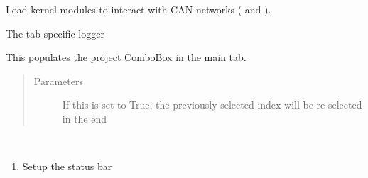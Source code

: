 \documentclass[letterpaper,10pt,english]{sphinxmanual}
\begin{document}
\begin{fulllineitems}
\begin{fulllineitems}
\end{fulllineitems}


\begin{fulllineitems}
\label{\detokenize{src:src.MainTab.MainTab.loadKernelModules}}
Load kernel modules to interact with CAN networks ( and ).

\end{fulllineitems}


\begin{fulllineitems}
\label{\detokenize{src:src.MainTab.MainTab.logger}}
The tab specific logger

\end{fulllineitems}


\begin{fulllineitems}
\label{\detokenize{src:src.MainTab.MainTab.populateProjects}}
This populates the project ComboBox in the main tab.
\begin{quote}\begin{description}
\item[{Parameters}] \leavevmode
{} \textendash{} If this is set to True, the previously selected index will be re-selected in the end

\end{description}\end{quote}

\end{fulllineitems}


\begin{fulllineitems}
\label{\detokenize{src:src.MainTab.MainTab.prepareUI}}~\begin{enumerate}
\item {} 
Setup the status bar


\end{enumerate}
\end{fulllineitems}
\end{fulllineitems}
\end{document}

